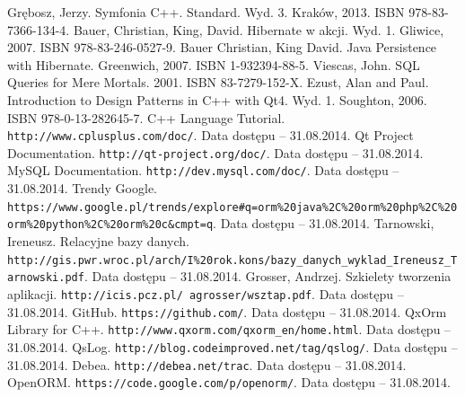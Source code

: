 \documentclass[12pt]{report}
\begin{document}
\begin{thebibliography}{99}
 Grębosz, Jerzy. Symfonia C++. Standard. Wyd. 3. Kraków, 2013. ISBN 978-83-7366-134-4.
 Bauer, Christian, King, David. Hibernate w akcji. Wyd. 1. Gliwice, 2007. ISBN 978-83-246-0527-9.
 Bauer Christian, King David. Java Persistence with Hibernate. Greenwich, 2007. ISBN 1-932394-88-5.
 Viescas, John. SQL Queries for Mere Mortals. 2001. ISBN 83-7279-152-X.
 Ezust, Alan and Paul. Introduction to Design Patterns in C++ with Qt4. Wyd. 1. Soughton, 2006. ISBN 978-0-13-282645-7.
 C++ Language Tutorial. {\tt http://www.cplusplus.com/doc/}. Data dostępu -- 31.08.2014.
Qt Project Documentation. {\tt http://qt-project.org/doc/}. Data dostępu -- 31.08.2014.
 MySQL Documentation. {\tt http://dev.mysql.com/doc/}. Data dostępu -- 31.08.2014.
 Trendy Google. {\tt https://www.google.pl/trends/explore\#q=orm\%20\-java\%2C\%20orm\%20php\%2C\%20orm\%20python\%2C\%20orm\%20c\&cmpt=q}.
Data dostępu -- 31.08.2014.
 Tarnowski, Ireneusz. Relacyjne bazy danych. {\tt http://gis.pwr.wroc.pl/arch/I\%20rok.kons/bazy\_danych\_wyklad\linebreak\_Ireneusz\_Tarnowski.pdf}. Data dostępu -- 31.08.2014.
 Grosser, Andrzej. Szkielety tworzenia aplikacji. {\tt http://icis.pcz.pl/~agrosser/wsztap.pdf}. Data dostępu -- 31.08.2014.
 GitHub. {\tt https://github.com/}. Data dostępu -- 31.08.2014.
 QxOrm Library for C++. {\tt http://www.qxorm.com/qxorm\_en/home.html}. Data dostępu -- 31.08.2014.
 QsLog. {\tt http://blog.codeimproved.net/tag/qslog/}. Data dostępu -- 31.08.2014.
 Debea. {\tt http://debea.net/trac}. Data dostępu -- 31.08.2014.
 OpenORM. {\tt https://code.google.com/p/openorm/}. Data dostępu -- 31.08.2014.
\end{thebibliography}

\listoffigures

\listoftables

\lstlistoflistings
\end{document}
